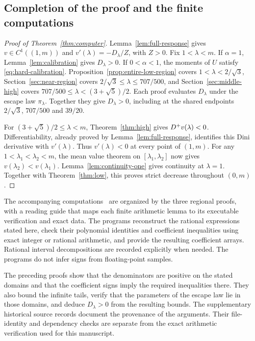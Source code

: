 \subsection{Completion of the proof and the finite computations}
\label{subsec:completion}
\begin{proof}[Proof of Theorem~\ref{thm:computer}]
Lemma~\ref{lem:full-response} gives $v\in C^1((1,m))$ and
$v'(\lambda)=-D_\lambda/Z$, with $Z>0$. Fix $1<\lambda<m$.
If $\alpha=1$, Lemma~\ref{lem:calibration} gives $D_\lambda>0$.
If $0<\alpha<1$, the moments of $U$ satisfy
\eqref{eq:hard-calibration}. Proposition~\ref{prop:entire-low-region}
covers $1<\lambda<2/\sqrt3$,
Section~\ref{sec:near-region} covers $2/\sqrt3\le\lambda\le707/500$,
and Section~\ref{sec:middle-high} covers
$707/500\le\lambda<(3+\sqrt5)/2$.
Each proof evaluates $D_\lambda$ under the escape law $\pi_\lambda$.
Together they give $D_\lambda>0$, including at the shared endpoints
$2/\sqrt3$, $707/500$ and $39/20$.

For $(3+\sqrt5)/2\le\lambda<m$, Theorem~\ref{thm:high} gives
$D^{+} v(\lambda)<0$. Differentiability, already proved by
Lemma~\ref{lem:full-response}, identifies this Dini derivative with
$v'(\lambda)$. Thus $v'(\lambda)<0$ at every point of $(1,m)$.
For any $1<\lambda_1<\lambda_2<m$, the mean value theorem on
$[\lambda_1,\lambda_2]$ now gives $v(\lambda_2)<v(\lambda_1)$.
Lemma~\ref{lem:continuity-one} gives continuity at $\lambda=1$.
Together with Theorem~\ref{thm:low}, this proves strict decrease
throughout $(0,m)$.
\end{proof}

The accompanying computations~\cite{Supplement} are organized by the
three regional proofs, with a reading guide that maps each finite
arithmetic lemma to its executable verification and exact data.
The programs reconstruct the rational expressions stated here, check
their polynomial identities and coefficient inequalities using exact
integer or rational arithmetic, and provide the resulting coefficient
arrays. Rational interval decompositions are recorded explicitly when
needed. The programs do not infer signs from floating-point samples.

The preceding proofs show that the denominators are positive on the stated domains and that the coefficient signs imply the required inequalities there. They also bound the infinite tails, verify that the parameters of the escape law lie in those domains, and deduce $D_\lambda>0$ from the resulting bounds.
The supplementary historical source records document the provenance of
the arguments. Their file-identity and dependency checks are separate
from the exact arithmetic verification used for this manuscript.
